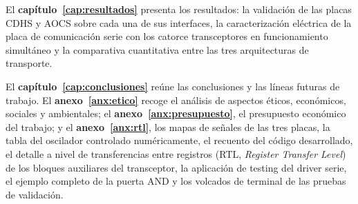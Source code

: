 El \textbf{capítulo~\ref{cap:resultados}} presenta los resultados: la validación de las placas CDHS y AOCS sobre
cada una de sus interfaces, la caracterización eléctrica de la placa de comunicación serie con
los catorce transceptores en funcionamiento simultáneo y la comparativa cuantitativa entre las
tres arquitecturas de transporte.

El \textbf{capítulo~\ref{cap:conclusiones}} reúne las conclusiones y las líneas futuras de trabajo. El
\textbf{anexo~\ref{anx:etico}} recoge el análisis de aspectos éticos, económicos, sociales y
ambientales; el \textbf{anexo~\ref{anx:presupuesto}}, el
presupuesto económico del trabajo; y el \textbf{anexo~\ref{anx:rtl}}, los mapas de señales de las tres placas,
la tabla del oscilador controlado numéricamente, el recuento del código desarrollado, el detalle
a nivel de transferencias entre registros (RTL, \textit{Register Transfer Level}) de los bloques
auxiliares del transceptor, la aplicación de testing del driver serie, el ejemplo completo de la
puerta AND y los volcados de terminal de las pruebas de validación.


